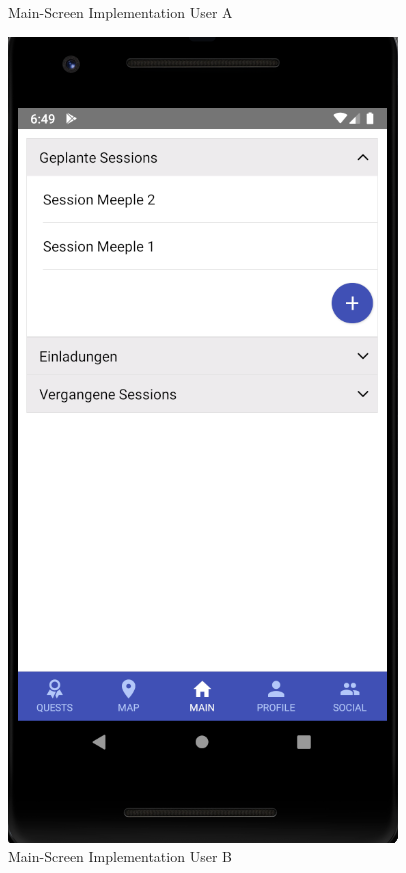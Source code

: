 \begin{figure}[H]
\begin{minipage}[b]{0.4\textwidth}
    \caption{Main-Screen Implementation User A}
    \label{fig:mainscreenusera}
  \end{minipage}
  \hfill
  \begin{minipage}[b]{0.4\textwidth}
    \includegraphics[width=\textwidth]{images/mainscreen_implementation_meeple.PNG}
    \caption{Main-Screen Implementation User B}
    \label{fig:mainscreenuserb}
  \end{minipage}
\end{figure}

